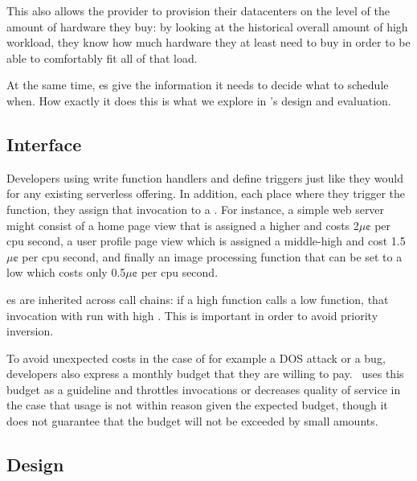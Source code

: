 This also allows the provider to provision their datacenters on the level of the
amount of hardware they buy: by looking at the historical overall amount of high
\priceclass{} workload, they know how much hardware they at least need to buy in
order to be able to comfortably fit all of that load.


At the same time, \class{}es give \sys{} the information it needs to decide what
to schedule when. How exactly it does this is what we explore in \sys{}'s design
and evaluation.



\subsection{Interface}


Developers using \sys{} write function handlers and define triggers just like
they would for any existing serverless offering. In addition, each place where
they trigger the function, they assign that invocation to a \priceclass{}. For
instance, a simple web server might consist of a home page view that is assigned
a higher \priceclass{} and costs 2$\mu\cent$ per cpu second, a user profile page
view which is assigned a middle-high \class{} and cost 1.5$\mu\cent$ per cpu
second, and finally an image processing function that can be set to a low
\class{} which costs only 0.5$\mu\cent$ per cpu second.

\Class{}es are inherited across call chains: if a high \class{} function calls a
low \class{} function, that invocation with run with high \class{}. This is
important in order to avoid priority inversion.

To avoid unexpected costs in the case of for example a DOS attack or a bug,
developers also express a monthly budget that they are willing to pay.\ \sys{}
uses this budget as a guideline and throttles invocations or decreases quality
of service in the case that usage is not within reason given the expected
budget, though it does not guarantee that the budget will not be exceeded by
small amounts.



\subsection{\Sys{} Design}

